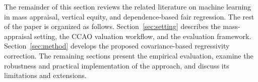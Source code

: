 \documentclass[10pt]{article}
\theoremstyle{definition}
\newcommand{\1}{\mathbf{1}}
\begin{document}
{The remainder of this section reviews the related literature on machine learning in mass appraisal, vertical equity, and dependence-based fair regression. The rest of the paper is organized as follows.} Section~\ref{sec:setting} describes the mass-appraisal setting, the CCAO valuation workflow, and the evaluation framework. Section~\ref{sec:method} develops the proposed covariance-based regressivity correction. The remaining sections present the empirical evaluation, examine the robustness and practical implementation of the approach, and discuss its limitations and extensions.





\end{document}
